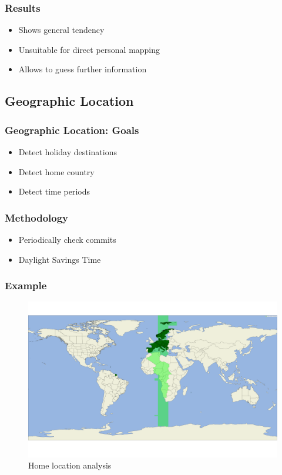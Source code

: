 \documentclass{beamer}
\begin{document}
\begin{frame}
    \frametitle{Results}
    \begin{itemize}
        \item Shows general tendency
        \pause{}
        \item Unsuitable for direct personal mapping
        \pause{}
        \item Allows to guess further information
    \end{itemize}
\end{frame}


\subsection{Geographic Location}
\begin{frame}
    \frametitle{Geographic Location: Goals}
    \begin{itemize}
        \item Detect holiday destinations
        \pause{}
        \item Detect home country
        \pause{}
        \item Detect time periods
    \end{itemize}
\end{frame}

\begin{frame}
    \frametitle{Methodology}
    \begin{itemize}
        \item Periodically check commits
        \pause{}
        \item Daylight Savings Time
    \end{itemize}
\end{frame}

\begin{frame}
    \frametitle{Example}
    \begin{figure}[H]
        \includegraphics[scale=0.22]{analysis/author-home-location}
        \centering
        \caption{Home location analysis}
    \end{figure}
\end{frame}
\end{document}
